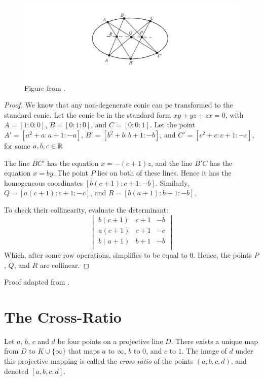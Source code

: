 \begin{figure}[H]
  \center
  \includegraphics[width=\linewidth]{pictures/pascal.png}
  \caption{Figure from \cite{brannan}.}
  \label{fig:pascal}
\end{figure}

\begin{proof}
  We know that any non-degenerate conic can pe transformed to the standard conic. Let the conic
  be in the standard form $xy+yz+zx=0$, with $A=[1:0:0]$, $B=[0:1:0]$, and $C=[0:0:1]$. Let the
  point $A'=[a^2+a:a+1:-a]$, $B'=[b^2+b:b+1:-b]$, and $C'=[c^2+c:c+1:-c]$, for some $a,b,c\in\mathbb{R}$

  The line $BC'$ has the equation $x=-(c+1)z$, and the line $B'C$ has the equation $x=by$. The
  point $P$ lies on both of these lines. Hence it has the homogeneous coordinates
  $[b(c+1):c+1:-b]$. Similarly, $Q=[a(c+1):c+1:-c]$, and $R=[b(a+1):b+1:-b]$.

  To check their collinearity, evaluate the determinant:
  \[
    \begin{vmatrix}
      b(c+1) & c+1 & -b \\
      a(c+1) & c+1 & -c \\
      b(a+1) & b+1 & -b \\
    \end{vmatrix}
  \]
  Which, after some row operations, simplifies to be equal to $0$.
  Hence, the points $P$, $Q$, and $R$ are collinear.
\end{proof}

Proof adapted from \cite{brannan}.

\section{The Cross-Ratio}

\begin{definition}
  Let $a$, $b$, $c$ and $d$ be four points on a projective line $D$. There exists a unique map
  from $D$ to $K\cup\{\infty\}$ that maps $a$ to $\infty$, $b$ to $0$, and $c$ to $1$. The
  image of $d$ under this projective mapping is called the \textit{cross-ratio} of the points
  $(a,b,c,d)$, and denoted $[a,b,c,d]$.
\end{definition}

